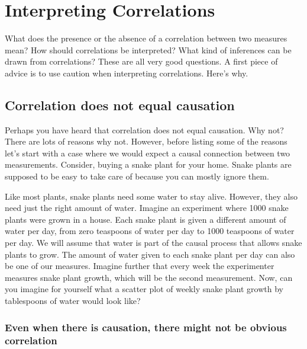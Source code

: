 \documentclass[
  letterpaper,
  DIV=11,
  numbers=noendperiod]{scrreprt}
\begin{document}
\section{Interpreting Correlations}\label{interpreting-correlations}

What does the presence or the absence of a correlation between two
measures mean? How should correlations be interpreted? What kind of
inferences can be drawn from correlations? These are all very good
questions. A first piece of advice is to use caution when interpreting
correlations. Here's why.

\subsection{Correlation does not equal
causation}\label{correlation-does-not-equal-causation}

Perhaps you have heard that correlation does not equal causation. Why
not? There are lots of reasons why not. However, before listing some of
the reasons let's start with a case where we would expect a causal
connection between two measurements. Consider, buying a snake plant for
your home. Snake plants are supposed to be easy to take care of because
you can mostly ignore them.

Like most plants, snake plants need some water to stay alive. However,
they also need just the right amount of water. Imagine an experiment
where 1000 snake plants were grown in a house. Each snake plant is given
a different amount of water per day, from zero teaspoons of water per
day to 1000 teaspoons of water per day. We will assume that water is
part of the causal process that allows snake plants to grow. The amount
of water given to each snake plant per day can also be one of our
measures. Imagine further that every week the experimenter measures
snake plant growth, which will be the second measurement. Now, can you
imagine for yourself what a scatter plot of weekly snake plant growth by
tablespoons of water would look like?

\subsubsection{Even when there is causation, there might not be obvious
correlation}\label{even-when-there-is-causation-there-might-not-be-obvious-correlation}
\end{document}
